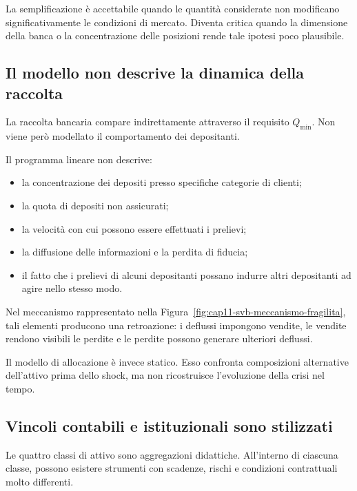 La semplificazione \`e accettabile quando le quantit\`a considerate non
modificano significativamente le condizioni di mercato. Diventa critica
quando la dimensione della banca o la concentrazione delle posizioni rende
tale ipotesi poco plausibile.

\subsection{Il modello non descrive la dinamica della raccolta}

La raccolta bancaria compare indirettamente attraverso il requisito
\(Q_{\min}\). Non viene per\`o modellato il comportamento dei depositanti.

Il programma lineare non descrive:

\begin{itemize}

\item la concentrazione dei depositi presso specifiche categorie di clienti;

\item la quota di depositi non assicurati;

\item la velocit\`a con cui possono essere effettuati i prelievi;

\item la diffusione delle informazioni e la perdita di fiducia;

\item il fatto che i prelievi di alcuni depositanti possano indurre altri
depositanti ad agire nello stesso modo.

\end{itemize}

Nel meccanismo rappresentato nella
Figura~\ref{fig:cap11-svb-meccanismo-fragilita}, tali elementi producono una
retroazione: i deflussi impongono vendite, le vendite rendono visibili le
perdite e le perdite possono generare ulteriori deflussi.

Il modello di allocazione \`e invece statico. Esso confronta composizioni
alternative dell'attivo prima dello shock, ma non ricostruisce l'evoluzione
della crisi nel tempo.

\subsection{Vincoli contabili e istituzionali sono stilizzati}

Le quattro classi di attivo sono aggregazioni didattiche. All'interno di
ciascuna classe, possono esistere strumenti con scadenze, rischi e condizioni
contrattuali molto differenti.

